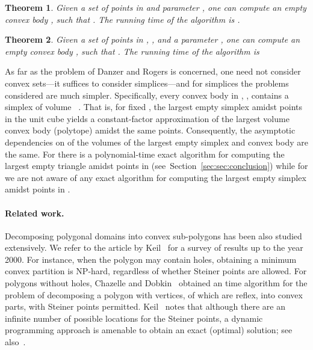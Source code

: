 \documentclass[11pt]{article}
\newtheorem{theorem}{Theorem}
\newcommand{\secref}[1]{Section~\ref{sec:#1}}
\newcommand{\thmlab}[1]{{\label{theo:#1}}}
\begin{document}
\begin{theorem}\thmlab{algorithm:2d}
    Given a set  of  points in  and
    parameter , one can compute an empty convex body
    , such that . The running time of the algorithm is
    .
\end{theorem}

\begin{theorem}\thmlab{empty}
    Given a set  of  points in , , and
    a parameter , one can compute an empty convex body
    , such that . The running time of the algorithm is
   
\end{theorem}

As far as the problem of Danzer and Rogers is concerned,
one need not consider convex sets---it suffices to consider
simplices---and for simplices the problems considered are much
simpler. Specifically, every convex body  in ,
, contains a simplex  of volume
~\cite{Las11}.
That is, for fixed , the largest empty simplex amidst  points in
the unit cube  yields a constant-factor approximation
of the largest volume convex body (polytope) amidst the same  points.
Consequently, the asymptotic dependencies on  of the volumes of the
largest empty simplex and convex body are the same.
For  there is a polynomial-time exact algorithm for computing the
largest empty triangle amidst  points in  (see~\secref{sec:conclusion})
while for  we are not aware of any exact algorithm for computing the
largest empty simplex amidst  points in .


\paragraph{Related work.}
Decomposing polygonal domains into convex sub-polygons has been also
studied extensively. We refer to the article by Keil~\cite{K00} for a
survey of results up to the year 2000. For instance, when the polygon
may contain holes, obtaining a minimum convex partition is NP-hard,
regardless of whether Steiner points are allowed.  For polygons
without holes, Chazelle and Dobkin~\cite{CD79} obtained an 
time algorithm for the problem of decomposing a polygon with 
vertices,  of which are reflex, into convex parts, with Steiner
points permitted. Keil~\cite{K00} notes that although there are
an infinite number of possible locations for the Steiner points,
a dynamic programming approach is amenable to obtain an exact
(optimal) solution; see also~\cite{KS02,Sh92}.
\end{document}

